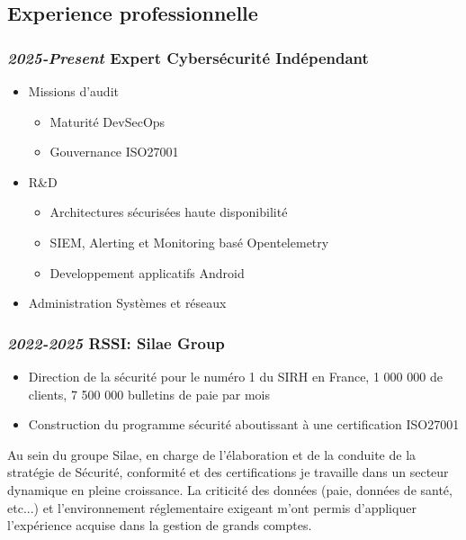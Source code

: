 \documentclass[a4paper, oneside, final]{scrartcl} %
\begin{document}
\begin{center}
\section*{Experience professionnelle}
\subsubsection*{\textit{\textbf{2025-Present}} Expert Cybersécurité Indépendant }
\begin{itemize}
\item Missions d'audit
    \begin{itemize}
        \item Maturité DevSecOps
        \item Gouvernance ISO27001
    \end{itemize}
\item R\&D
    \begin{itemize}
        \item Architectures sécurisées haute disponibilité
        \item SIEM, Alerting et Monitoring basé Opentelemetry
        \item Developpement applicatifs Android
    \end{itemize}
\item Administration Systèmes et réseaux
\end{itemize}

\subsubsection*{\textit{\textbf{2022-2025}} RSSI: Silae Group }
\begin{itemize}
\item Direction de la sécurité pour le numéro 1 du SIRH en France, 1 000 000 de clients, 7 500 000 bulletins de paie par mois
\item Construction du programme sécurité aboutissant à une certification ISO27001
\end{itemize}

\begin{justify}
Au sein du groupe Silae, en charge de l'élaboration et de la conduite de la stratégie de Sécurité, conformité et des certifications je travaille dans un secteur dynamique en pleine croissance.
La criticité des données (paie, données de santé, etc...) et l'environnement réglementaire exigeant m'ont permis d'appliquer l'expérience acquise dans la gestion de grands comptes.
\end{justify}


\end{center}
\end{document}
